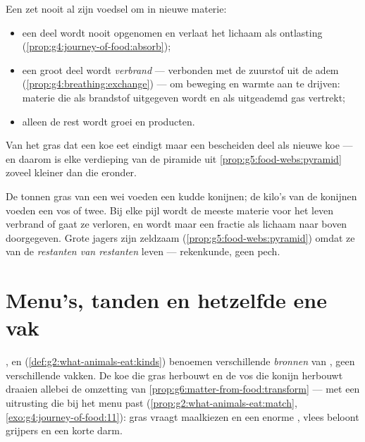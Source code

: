 \begin{proposition}\label{prop:g6:matter-from-food:losses}
Een  zet nooit al zijn voedsel om in nieuwe materie:
\begin{itemize}
  \item een deel wordt nooit opgenomen en verlaat het lichaam als
        ontlasting (\cref{prop:g4:journey-of-food:absorb});
  \item een groot deel wordt \emph{verbrand} --- verbonden met de
        zuurstof uit de adem
        (\cref{prop:g4:breathing:exchange}) --- om beweging en warmte
        aan te drijven: materie die als brandstof uitgegeven wordt en
        als uitgeademd gas vertrekt;
  \item alleen de rest wordt groei en producten.
\end{itemize}
Van het gras dat een koe eet eindigt maar een bescheiden deel als nieuwe
koe --- en daarom is elke verdieping van de piramide uit
\cref{prop:g5:food-webs:pyramid} zoveel kleiner dan die eronder.
\end{proposition}
\admitted

\begin{example}\label{ex:g6:matter-from-food:pyramid}
De tonnen gras van een wei voeden een kudde konijnen; de kilo's van de
konijnen voeden een vos of twee. Bij elke pijl wordt de meeste materie
voor het leven verbrand of gaat ze verloren, en wordt maar een fractie
als lichaam naar boven doorgegeven. Grote jagers zijn zeldzaam
(\cref{prop:g5:food-webs:pyramid}) omdat ze van de \emph{restanten van
restanten} leven --- rekenkunde, geen pech.
\end{example}

\section{Menu's, tanden en hetzelfde ene vak}

\begin{proposition}\label{prop:g6:matter-from-food:menus}
,  en 
(\cref{def:g2:what-animals-eat:kinds}) benoemen verschillende
\emph{bronnen} van , geen verschillende vakken. De koe
die gras herbouwt en de vos die konijn herbouwt draaien allebei de
omzetting van \cref{prop:g6:matter-from-food:transform} --- met een
uitrusting die bij het menu past
(\cref{prop:g2:what-animals-eat:match},
\cref{exo:g4:journey-of-food:11}): gras vraagt maalkiezen en een enorme
, vlees beloont grijpers en een korte darm.
\end{proposition}
\admitted

